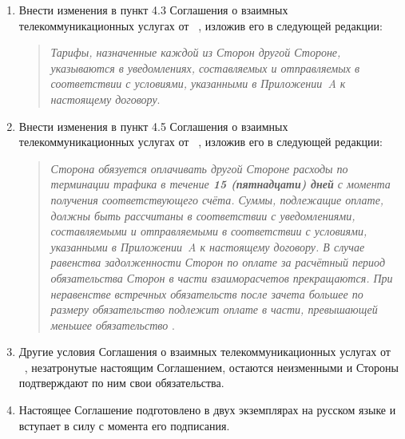 \begin{Form}
  \begin{enumerate}
    \item Внести изменения в пункт 4.3 Соглашения о взаимных телекоммуникационных услугах
            от \underline{\TextField[name=contractdate,charsize=10pt,width=5em,height=1em,borderwidth=0,
            bordercolor={1 1 1},align=0]{}} \No~\underline{\TextField[name=contractnum,charsize=10pt,width=6em,
            height=1em,borderwidth=0,bordercolor={1 1 1},align=0]{}}, изложив его в следующей редакции:
            \begin{quote}
            \textit{\flqq{}Тарифы, назначенные каждой из Сторон другой Стороне, указываются в уведомлениях,
            составляемых и отправляемых в соответствии с условиями, указанными в \flqq{}Приложении~A\frqq{}
            к настоящему договору\frqq{}}.
            \end{quote}
    \item Внести изменения в пункт 4.5 Соглашения о взаимных телекоммуникационных услугах
            от \underline{\TextField[name=contractdate,charsize=10pt,width=5em,height=1em,borderwidth=0,
            bordercolor={1 1 1},align=0]{}} \No~\underline{\TextField[name=contractnum,charsize=10pt,width=6em,
            height=1em,borderwidth=0,bordercolor={1 1 1},align=0]{}}, изложив его в следующей редакции:
            \begin{quote}
              \textit{\flqq{}Сторона  обязуется оплачивать другой Стороне  расходы по терминации трафика в течение
              \textbf{15 (пятнадцати) дней} с момента получения соответствующего счёта.
              Суммы, подлежащие оплате, должны быть рассчитаны в
              соответствии с уведомлениями, составляемыми и отправляемыми в соответствии с условиями,
              указанными в \flqq{}Приложении~A\frqq{} к настоящему договору.
              В случае равенства задолженности Сторон по оплате за расчётный период обязательства
              Сторон в части взаиморасчетов прекращаются.
              При неравенстве встречных обязательств после зачета большее по размеру обязательство подлежит
              оплате в части, превышающей меньшее обязательство
            \frqq{}}.
            \end{quote}
    \item Другие условия Соглашения о взаимных телекоммуникационных услугах
            от \underline{\TextField[name=contractdate,charsize=10pt,width=5em,height=1em,borderwidth=0,
            bordercolor={1 1 1},align=0]{}} \No~\underline{\TextField[name=contractnum,charsize=10pt,width=6em,
            height=1em,borderwidth=0,bordercolor={1 1 1},align=0]{}}, незатронутые настоящим Соглашением,
            остаются неизменными и Стороны подтверждают по ним свои обязательства.
    \item Настоящее Соглашение подготовлено в двух экземплярах на русском языке и вступает в силу с момента
            его подписания.
  \end{enumerate}


\end{Form}
